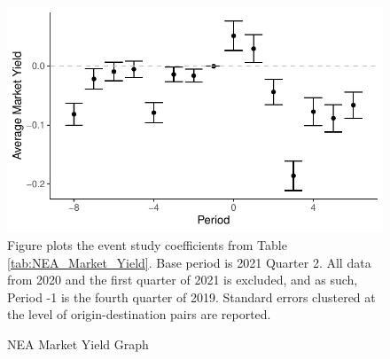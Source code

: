 \documentclass{article}
\begin{document}
\begin{appendices}
	\begin{figure}
		\caption{NEA Market Yield Graph}
		\label{fig:NEA_Market_Yield}
		\includegraphics[width = \linewidth]{NEA_Market_Yield_Graph.pdf}
		\footnotesize{Figure plots the event study coefficients from Table \ref{tab:NEA_Market_Yield}. Base period is 2021 Quarter 2. All data from 2020 and the first quarter of 2021 is excluded, and as such, Period -1 is the fourth quarter of 2019. Standard errors clustered at the level of origin-destination pairs are reported. }
	\end{figure}
	

\end{appendices}
\end{document}
